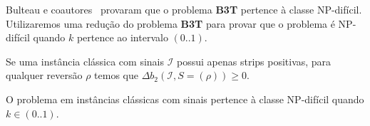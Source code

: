 Bulteau e coautores~\cite{2012-bulteau-etal} provaram que o problema \textbf{B3T} pertence à classe NP-difícil. Utilizaremos uma redução do problema \textbf{B3T} para provar que o problema \SbPRT{} é NP-difícil quando $k$ pertence ao intervalo $(0..1)$.

\begin{lemma}\label{lemma:CWNRJAPM}
Se uma instância clássica com sinais $\mathcal{I}$ possui apenas strips positivas, para qualquer reversão $\rho$ temos que $\Delta b_2(\mathcal{I}, S=(\rho)) \ge 0$.
\end{lemma}

\begin{theorem}\label{theorem:NSWQYFLG}
O problema \SbPRT{} em instâncias clássicas com sinais pertence à classe NP-difícil quando $k \in (0..1)$.
\end{theorem}
